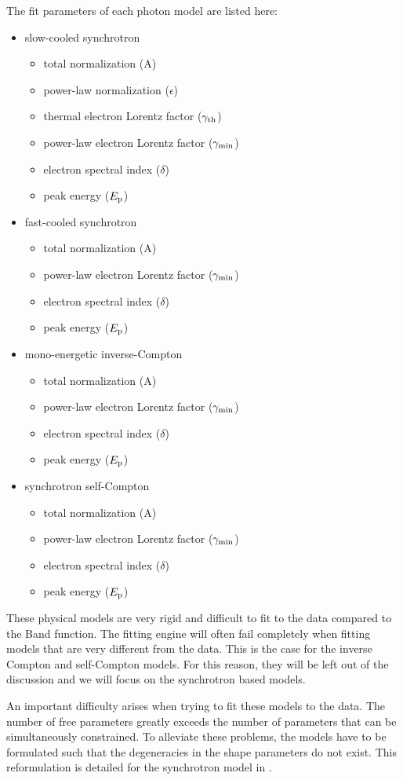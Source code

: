 The fit parameters of each photon model are listed here:
\begin{itemize}
\item slow-cooled synchrotron
  \begin{itemize}
  \item total normalization (A)
  \item power-law normalization ($\epsilon$)
  \item thermal electron Lorentz factor ($\gamma_{\rm th}$)
  \item power-law electron Lorentz factor ($\gamma_{\rm min}$)
  \item electron spectral index ($\delta$)
    \item peak energy ($E_{\rm p}$)
  \end{itemize}
\item fast-cooled synchrotron
  \begin{itemize}
  \item total normalization (A)
    \item power-law electron Lorentz factor ($\gamma_{\rm min}$)
  \item electron spectral index ($\delta$)
    \item peak energy ($E_{\rm p}$)
  \end{itemize}
\item mono-energetic inverse-Compton
  \begin{itemize}
  \item total normalization (A)
    \item power-law electron Lorentz factor ($\gamma_{\rm min}$)
  \item electron spectral index ($\delta$)
    \item peak energy ($E_{\rm p}$)
  \end{itemize}
\item synchrotron self-Compton
  \begin{itemize}
  \item total normalization (A)
    \item power-law electron Lorentz factor ($\gamma_{\rm min}$)
  \item electron spectral index ($\delta$)
    \item peak energy ($E_{\rm p}$)
  \end{itemize}

\end{itemize}
These physical models are very rigid and difficult to fit to the data
compared to the Band function. The fitting engine will often fail
completely when fitting models that are very different from the
data. This is the case for the inverse Compton and self-Compton
models. For this reason, they will be left out of the discussion and
we will focus on the synchrotron based models. 

An important difficulty arises when trying to fit these models to the
data. The number of free parameters greatly exceeds the number of
parameters that can be simultaneously constrained. To alleviate these
problems, the models have to be formulated such that the degeneracies
in the shape parameters do not exist. This reformulation is detailed
for the synchrotron model in .


